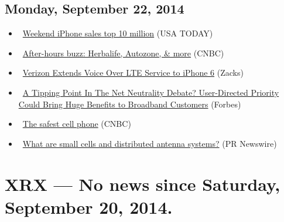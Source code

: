 \documentclass[11pt,asymmetric]{article}
\begin{document}
\subsection*{Monday, September 22, 2014}
\begin{itemize}
\item\ \href{http://www.usatoday.com/story/tech/2014/09/22/weekend-iphone-sales/16040213/}{Weekend iPhone sales top 10 million} (USA TODAY)
\item\ \href{http://www.cnbc.com/id/102022829?__source=yahoo%7cfinance%7cheadline%7cheadline%7cstory&par=yahoo&doc=102022829}{After-hours buzz: Herbalife, Autozone, \& more} (CNBC)
\item\ \href{http://finance.yahoo.com/news/verizon-extends-voice-over-lte-200325721.html}{Verizon Extends Voice Over LTE Service to iPhone 6} (Zacks)
\item\ \href{http://www.forbes.com/sites/halsinger/2014/09/22/a-tipping-point-in-the-net-neutrality-debate-user-directed-priority-could-bring-huge-benefits-to-broadband-customers/?partner=yahootix}{A Tipping Point In The Net Neutrality Debate? User-Directed Priority Could Bring Huge Benefits to Broadband Customers} (Forbes)
\item\ \href{http://finance.yahoo.com/video/safest-cell-phone-180700395.html}{The safest cell phone} (CNBC)
\item\ \href{http://finance.yahoo.com/news/small-cells-distributed-antenna-systems-175100027.html}{What are small cells and distributed antenna systems?} (PR Newswire)
\end{itemize}

\section*{XRX --- No news since Saturday, September 20, 2014.}
\end{document}
